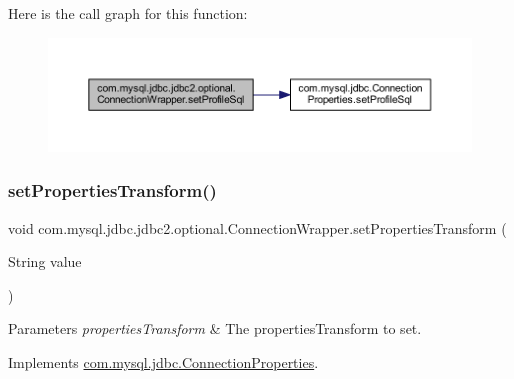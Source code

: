 Here is the call graph for this function\+:
\nopagebreak
\begin{figure}[H]
\begin{center}
\leavevmode
\includegraphics[width=350pt]{classcom_1_1mysql_1_1jdbc_1_1jdbc2_1_1optional_1_1_connection_wrapper_afe33bc3a8bc2ecba4e453c1bcb3d5d2d_cgraph}
\end{center}
\end{figure}
\mbox{\label{classcom_1_1mysql_1_1jdbc_1_1jdbc2_1_1optional_1_1_connection_wrapper_a6c9f8bd8652930ab22706c7c3cf23471}} 
\subsubsection{\texorpdfstring{set\+Properties\+Transform()}{setPropertiesTransform()}}
{\footnotesize\ttfamily void com.\+mysql.\+jdbc.\+jdbc2.\+optional.\+Connection\+Wrapper.\+set\+Properties\+Transform (\begin{DoxyParamCaption}\item[{String}]{value }\end{DoxyParamCaption})}


\begin{DoxyParams}{Parameters}
{\em properties\+Transform} & The properties\+Transform to set. \\
\hline
\end{DoxyParams}


Implements \mbox{\hyperlink{interfacecom_1_1mysql_1_1jdbc_1_1_connection_properties_a999fc9432437c9bf822f8e3ea6f03ce9}{com.\+mysql.\+jdbc.\+Connection\+Properties}}.

